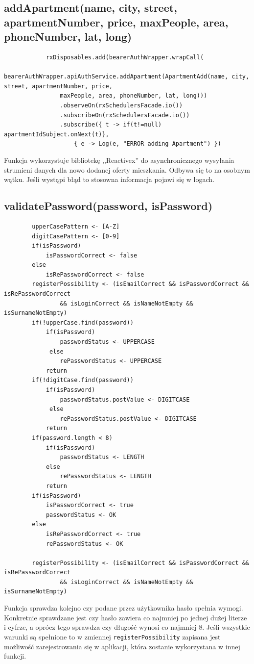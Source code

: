 \documentclass[polish, 11pt]{article}
\begin{document}
    \subsection{addApartment(name, city, street, apartmentNumber, price, maxPeople, area, phoneNumber, lat, long)}
        \begin{lstlisting}
            rxDisposables.add(bearerAuthWrapper.wrapCall(
            bearerAuthWrapper.apiAuthService.addApartment(ApartmentAdd(name, city, street, apartmentNumber, price,
                maxPeople, area, phoneNumber, lat, long)))
                .observeOn(rxSchedulersFacade.io())
                .subscribeOn(rxSchedulersFacade.io())
                .subscribe({ t -> if(t!=null) apartmentIdSubject.onNext(t)},
                    { e -> Log(e, "ERROR adding Apartment") })
        \end{lstlisting}
        Funkcja wykorzystuje bibliotekę ,,Reactivex'' do asynchronicznego wysyłania strumieni danych dla nowo dodanej oferty mieszkania. Odbywa się to na osobnym wątku. Jeśli wystąpi błąd to stosowna informacja pojawi się w logach.
    \subsection{validatePassword(password, isPassword)}
         \begin{lstlisting}
        upperCasePattern <- [A-Z]
        digitCasePattern <- [0-9]
        if(isPassword)
            isPasswordCorrect <- false
        else 
            isRePasswordCorrect <- false
        registerPossibility <- (isEmailCorrect && isPasswordCorrect && isRePasswordCorrect
                && isLoginCorrect && isNameNotEmpty && isSurnameNotEmpty)
        if(!upperCase.find(password))
            if(isPassword)
                passwordStatus <- UPPERCASE
             else
                rePasswordStatus <- UPPERCASE
            return
        if(!digitCase.find(password))
            if(isPassword)
                passwordStatus.postValue <- DIGITCASE
             else
                rePasswordStatus.postValue <- DIGITCASE
            return
        if(password.length < 8)
            if(isPassword)
                passwordStatus <- LENGTH
            else
                rePasswordStatus <- LENGTH
            return
        if(isPassword)
            isPasswordCorrect <- true
            passwordStatus <- OK
        else 
            isRePasswordCorrect <- true
            rePasswordStatus <- OK
        
        registerPossibility <- (isEmailCorrect && isPasswordCorrect && isRePasswordCorrect
                && isLoginCorrect && isNameNotEmpty && isSurnameNotEmpty)
         \end{lstlisting}
         Funkcja sprawdza kolejno czy podane przez użytkownika hasło spełnia wymogi. Konkretnie sprawdzane jest czy hasło zawiera co najmniej po jednej dużej literze i cyfrze, a oprócz tego sprawdza czy długość wynosi co najmniej 8. Jeśli wszystkie warunki są spełnione to w zmiennej \texttt{registerPossibility} zapisana jest możliwość zarejestrowania się w aplikacji, która zostanie wykorzystana w innej funkcji.  
\end{document}
